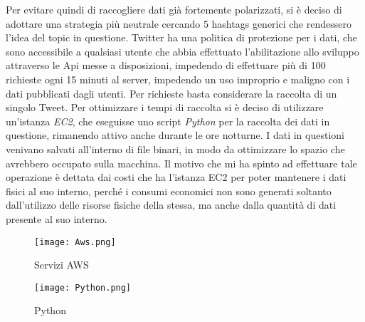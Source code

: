 Per evitare quindi di raccogliere dati già fortemente polarizzati, si è deciso di adottare una strategia più neutrale cercando 5 hashtags generici che rendessero l'idea del topic in questione.
Twitter ha una politica di protezione per i dati, che sono accessibile a qualsiasi utente che abbia effettuato l'abilitazione allo sviluppo attraverso le Api messe a disposizioni, impedendo di effettuare più di 100 richieste ogni 15 minuti al server, impedendo un uso improprio e maligno con i dati pubblicati dagli utenti. Per richieste basta considerare la raccolta di un singolo Tweet.
Per ottimizzare i tempi di raccolta si è deciso di utilizzare un'istanza \textit{EC2}, che eseguisse uno script \textit{Python} per la raccolta dei dati in questione, rimanendo attivo anche durante le ore notturne.
I dati in questioni venivano salvati all'interno di file binari, in modo da ottimizzare lo spazio che avrebbero occupato sulla macchina.
Il motivo che mi ha spinto ad effettuare tale operazione è dettata dai costi che ha l'istanza EC2 per poter mantenere i dati fisici al suo interno, perché i consumi economici non sono generati soltanto dall'utilizzo delle risorse fisiche della stessa, ma anche dalla quantità di dati presente al suo interno.
 

\begin{figure}[htbp]
\centering
\begin{minipage}[c]{.40\textwidth}
\centering\setlength{\captionmargin}{0pt}%
\texttt{[image: Aws.png]}
\caption{Servizi AWS}
\end{minipage}%
\hspace{10mm}%
\begin{minipage}[c]{.40\textwidth}
\centering\setlength{\captionmargin}{0pt}%
\texttt{[image: Python.png]}
\caption{Python}
\end{minipage}
\end{figure}

